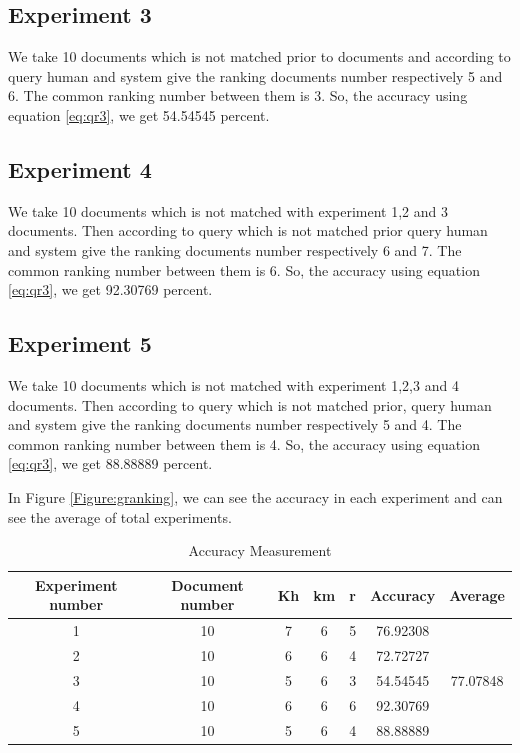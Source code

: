 \subsection{Experiment 3}

We take 10 documents which is not matched prior to documents and according to query human and system give the ranking documents number respectively 5 and 6. The common ranking number between them is 3. So, the accuracy using equation \ref{eq:qr3}, we get 54.54545 percent.

\subsection{Experiment 4}

We take 10 documents which is not matched with experiment 1,2 and 3 documents. Then according to query which is not matched prior query human and system give the ranking documents number respectively 6 and 7. The common ranking number between them is 6. So, the accuracy using equation \ref{eq:qr3}, we get 92.30769 percent.

\subsection{Experiment 5}

We take 10 documents which is not matched with experiment 1,2,3 and 4 documents. Then according to query which is not matched prior, query human and system give the ranking documents number respectively 5 and 4. The common ranking number between them is 4. So, the accuracy using equation \ref{eq:qr3}, we get 88.88889 percent.

In Figure \ref{Figure:granking}, we can see the accuracy in each experiment and can see the average of total experiments.

\begin{table}[htp]	
\centering

\caption{Accuracy Measurement }
\vspace{0.5cm}
\begin{tabular}{|c|c|c|c|c|c|c|} 
\hline

\textbf{Experiment number}	 & \textbf{Document number} & \textbf{Kh} & \textbf{km} & \textbf{r} & \textbf{Accuracy} & \textbf{Average} \\ \hline
 1 & 10 & 7 & 6 & 5 & 76.92308 &   \\ \hline
 2 & 10 & 6 & 6 & 4 & 72.72727 &   \\ \hline
 3 & 10 & 5 & 6 & 3 & 54.54545 & 77.07848  \\ \hline
 4 & 10 & 6 & 6 & 6 & 92.30769 &   \\ \hline
 5 & 10 & 5 & 6 & 4 & 88.88889 &   \\ \hline


\end{tabular}
\label{tab:Accuracy}
\end{table}


